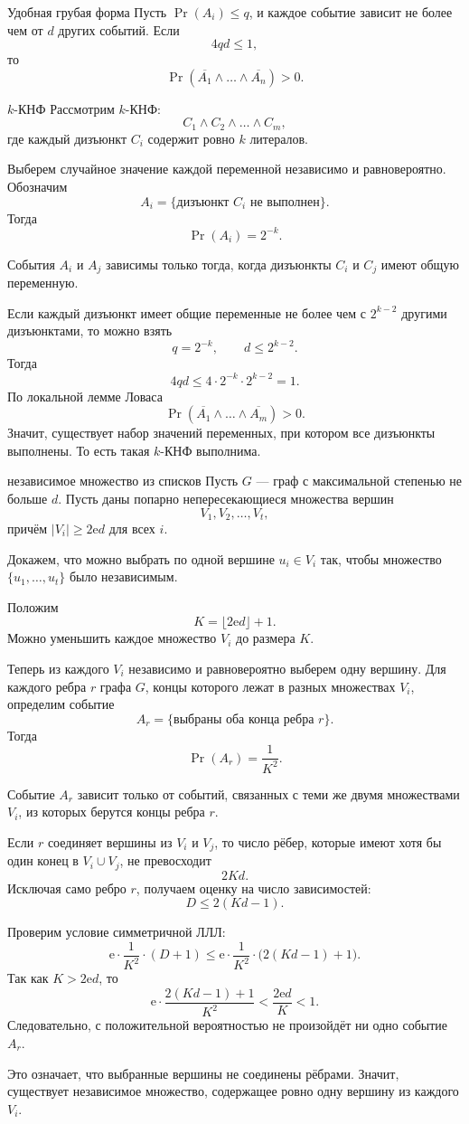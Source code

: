 \begin{Corollary}{Удобная грубая форма}{}
	Пусть $\Pr(A_i)\le q$, и каждое событие зависит не более чем от $d$ других событий.
	Если
	\[
	4qd\le 1,
	\]
	то
	\[
	\Pr\!\left(\overline{A_1}\wedge\dots\wedge\overline{A_n}\right)>0.
	\]
\end{Corollary}


\begin{Example}{$k$-КНФ}{}
Рассмотрим $k$-КНФ:
\[
C_1\wedge C_2\wedge\dots\wedge C_m,
\]
где каждый дизъюнкт $C_i$ содержит ровно $k$ литералов.

Выберем случайное значение каждой переменной независимо и равновероятно.
Обозначим
\[
A_i=\{\text{дизъюнкт $C_i$ не выполнен}\}.
\]
Тогда
\[
\Pr(A_i)=2^{-k}.
\]

События $A_i$ и $A_j$ зависимы только тогда, когда дизъюнкты $C_i$ и $C_j$ имеют общую
переменную.

Если каждый дизъюнкт имеет общие переменные не более чем с $2^{k-2}$ другими дизъюнктами,
то можно взять
\[
q=2^{-k},
\qquad
d\le 2^{k-2}.
\]
Тогда
\[
4qd
\le
4\cdot 2^{-k}\cdot 2^{k-2}
=1.
\]
По локальной лемме Ловаса
\[
\Pr\!\left(\overline{A_1}\wedge\dots\wedge\overline{A_m}\right)>0.
\]
Значит, существует набор значений переменных, при котором все дизъюнкты выполнены.
То есть такая $k$-КНФ выполнима.
\end{Example}

\begin{Example}{независимое множество из списков}{}
Пусть $G$ — граф с максимальной степенью не больше $d$.
Пусть даны попарно непересекающиеся множества вершин
\[
V_1,V_2,\dots,V_t,
\]
причём $|V_i|\ge 2\mathrm e d$
для всех $i$.

Докажем, что можно выбрать по одной вершине $u_i\in V_i$
так, чтобы множество $\{u_1,\dots,u_t\}$
было независимым.

Положим
\[
K=\lfloor 2\mathrm e d\rfloor+1.
\]
Можно уменьшить каждое множество $V_i$ до размера $K$.

Теперь из каждого $V_i$ независимо и равновероятно выберем одну вершину.
Для каждого ребра $r$ графа $G$, концы которого лежат в разных множествах $V_i$, определим
событие
\[
A_r=\{\text{выбраны оба конца ребра $r$}\}.
\]
Тогда
\[
\Pr(A_r)=\frac{1}{K^2}.
\]

Событие $A_r$ зависит только от событий, связанных с теми же двумя множествами $V_i$,
из которых берутся концы ребра $r$.

Если $r$ соединяет вершины из $V_i$ и $V_j$, то число рёбер, которые имеют хотя бы один конец
в $V_i\cup V_j$, не превосходит
\[
2Kd.
\]
Исключая само ребро $r$, получаем оценку на число зависимостей:
\[
D\le 2(Kd-1).
\]

Проверим условие симметричной ЛЛЛ:
\[
\mathrm e\cdot \frac{1}{K^2}\cdot (D+1)
\le
\mathrm e\cdot \frac{1}{K^2}\cdot \bigl(2(Kd-1)+1\bigr).
\]
Так как $K>2\mathrm e d$, то
\[
\mathrm e\cdot \frac{2(Kd-1)+1}{K^2}
<
\frac{2\mathrm e d}{K}
<1.
\]
Следовательно, с положительной вероятностью не произойдёт ни одно событие $A_r$.

Это означает, что выбранные вершины не соединены рёбрами.
Значит, существует независимое множество, содержащее ровно одну вершину из каждого $V_i$.
\end{Example}

